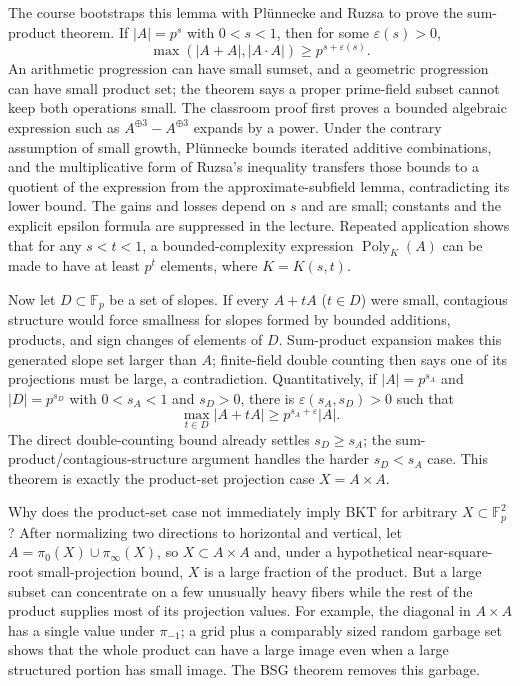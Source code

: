 The course bootstraps this lemma with Plünnecke and Ruzsa to prove the sum-product theorem. If \(|A|=p^s\) with \(0<s<1\), then for some \(\varepsilon(s)>0\), \[
\max(|A+A|,|A\cdot A|)\ge p^{s+\varepsilon(s)}.
\] An arithmetic progression can have small sumset, and a geometric progression can have small product set; the theorem says a proper prime-field subset cannot keep both operations small. The classroom proof first proves a bounded algebraic expression such as \(A^{\oplus3}-A^{\oplus3}\) expands by a power. Under the contrary assumption of small growth, Plünnecke bounds iterated additive combinations, and the multiplicative form of Ruzsa's inequality transfers those bounds to a quotient of the expression from the approximate-subfield lemma, contradicting its lower bound. The gains and losses depend on \(s\) and are small; constants and the explicit epsilon formula are suppressed in the lecture. Repeated application shows that for any \(s<t<1\), a bounded-complexity expression \(\operatorname{Poly}_K(A)\) can be made to have at least \(p^t\) elements, where \(K=K(s,t)\).

Now let \(D\subset\mathbb F_p\) be a set of slopes. If every \(A+tA\) (\(t\in D\)) were small, contagious structure would force smallness for slopes formed by bounded additions, products, and sign changes of elements of \(D\). Sum-product expansion makes this generated slope set larger than \(A\); finite-field double counting then says one of its projections must be large, a contradiction. Quantitatively, if \(|A|=p^{s_A}\) and \(|D|=p^{s_D}\) with \(0<s_A<1\) and \(s_D>0\), there is \(\varepsilon(s_A,s_D)>0\) such that \[
\max_{t\in D}|A+tA|\ge p^{s_A+\varepsilon}|A|.
\] The direct double-counting bound already settles \(s_D\ge s_A\); the sum-product/contagious-structure argument handles the harder \(s_D<s_A\) case. This theorem is exactly the product-set projection case \(X=A\times A\).

Why does the product-set case not immediately imply BKT for arbitrary \(X\subset\mathbb F_p^2\)? After normalizing two directions to horizontal and vertical, let \(A=\pi_0(X)\cup\pi_\infty(X)\), so \(X\subset A\times A\) and, under a hypothetical near-square-root small-projection bound, \(X\) is a large fraction of the product. But a large subset can concentrate on a few unusually heavy fibers while the rest of the product supplies most of its projection values. For example, the diagonal in \(A\times A\) has a single value under \(\pi_{-1}\); a grid plus a comparably sized random garbage set shows that the whole product can have a large image even when a large structured portion has small image. The BSG theorem removes this garbage.

